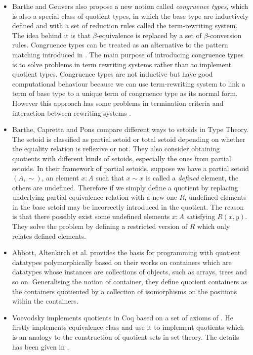 \begin{itemize}
\item Barthe and Geuvers \cite{bar:96} also propose a new notion called
\emph{congruence types}, which is also a special class of quotient
types, in which the base type are inductively defined and with a set
of reduction rules called the term-rewriting system. The idea behind
it is that $\beta$-equivalence is replaced by a set of
$\beta$-conversion rules. Congruence types can be treated as an
alternative to the pattern matching introduced in \cite{coq:92}. The main
purpose of introducing congruence types is to solve problems in
term rewriting systems rather than to implement quotient types.
Congruence types are not inductive but have good computational behaviour because we can use term-rewriting system to link a term of base type to a unique term of congruence type as its normal form.
However this approach has some problems in termination criteria and interaction between rewriting systems \cite{cou:01}.

\item Barthe, Capretta and Pons \cite{bar:03} compare different ways to setoids in Type Theory.
The setoid is classified as partial setoid or total setoid depending
on whether the equality relation is reflexive or not. They also
consider obtaining quotients with different kinds of setoids, especially
the ones from partial setoids.
In their framework of partial setoids, suppose we have a partial setoid $(A,\sim)$,  an element $x : A$ such that $x \sim x$ is called a \emph{defined} element, the others are undefined. Therefore if we simply define a quotient by replacing underlying partial equivalence relation with a new one $R$, undefined elements in the base setoid may be incorrectly introduced in the quotient. The reason is that there possibly exist some undefined elements $x : A$ satisfying $R(x,y)$. They solve the problem by defining a restricted version of $R$ which only relates defined elements.


\item Abbott, Altenkirch et al. \cite{abb:04} provides the basis for
programming with quotient datatypes polymorphically based on their
works on containers which are datatypes whose instances are
collections of objects, such as arrays, trees and so on. Generalising
the notion of container, they define quotient containers as the
containers quotiented by a collection of isomorphisms on the positions
within the containers.

\item Voevodsky \cite{voe:hset} implements quotients in Coq based on a set
of axioms of \hott. He firstly implements
equivalence class and use it to implement quotients which is an
analogy to the construction of quotient sets in set theory. The details has been given in .
\end{itemize}






